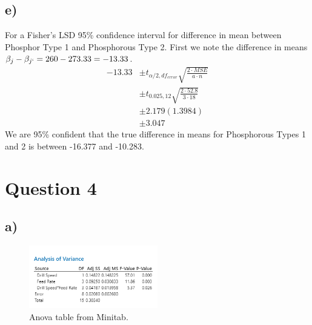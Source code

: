 \documentclass{article}
\begin{document}
\subsection*{e)}
For a Fisher's LSD 95\% confidence
interval for difference in mean between Phosphor Type 1 and Phosphorous Type 2.
First we note the difference in means $\beta_j - \beta_{j`} = 260 - 273.33 = -13.33$.
\begin{align*}
    -13.33 &\pm t_{\alpha/2, df_{error}} \sqrt{\frac{2 \cdot MSE}{a \cdot n}} \\
           &\pm t_{0.025, 12} \sqrt{\frac{2 \cdot 52.8}{3 \cdot 18}} \\
           &\pm 2.179 (1.3984) \\
           &\pm 3.047
\end{align*}
We are 95\% confident that the true difference in means for Phosphorous Types 1 and 2 is between -16.377 and -10.283.

\clearpage
\section*{Question 4}
\subsection*{a)}
\begin{figure}[h]
    \centering
    \includegraphics[width=0.5\textwidth]{./images/4_a.png}
    \caption{Anova table from Minitab.}
    \label{fig:3_b_2}
\end{figure}
\end{document}
